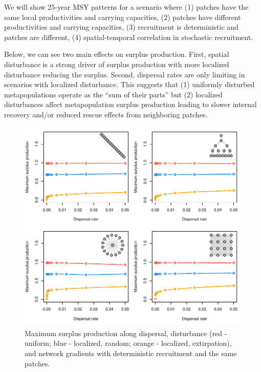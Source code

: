 \documentclass[
]{article}
\begin{document}
We will show 25-year MSY patterns for a scenario where (1) patches have
the same local productivities and carrying capacities, (2) patches have
different productivities and carrying capacities, (3) recruitment is
deterministic and patches are different, (4) spatial-temporal
correlation in stochastic recruitment.

Below, we can see two main effects on surplus production. First, spatial
disturbance is a strong driver of surplus production with more localized
disturbance reducing the surplus. Second, dispersal rates are only
limiting in scenarios with localized disturbance. This suggests that (1)
uniformly disturbed metapopulations operate as the ``sum of their
parts'' but (2) localized disturbances affect metapopulation surplus
production leading to slower internal recovery and/or reduced rescue
effects from neighboring patches.

\begin{figure}[H]

{\centering \includegraphics{Managing_for_ecological_surprises_in_metapopulations_files/figure-latex/MSY-1} 

}

\caption{Maximum surplus production along dispersal, disturbance (red - uniform; blue - localized, random; orange - localized, extirpation), and network gradients with deterministic recruitment and the same patches.}\label{fig:MSY}
\end{figure}
\end{document}
